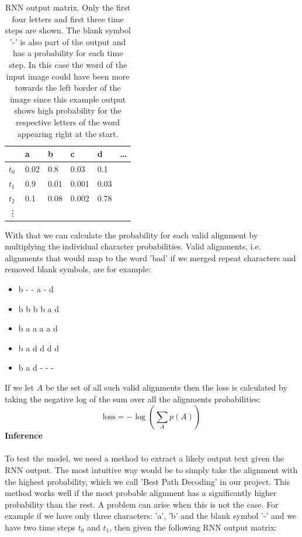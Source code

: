 \documentclass{article}
\begin{document}
\begin{table}[H]
\centering
\begin{tabular}{l|l|l|l|l|l}
       & a & b & c & d &\ldots \\ \hline
\(t_0\) & 0.02 & 0.8 & 0.03 & 0.1 & \\ \hline
\(t_1\) & 0.9 & 0.01 & 0.001 & 0.03 & \\ \hline
\(t_2\) & 0.1 & 0.08 & 0.002 & 0.78 & \\ \hline
\vdots       &         &         &         & 
\end{tabular}
\caption{RNN output matrix. Only the first four letters and first three time steps are shown. The blank  symbol '-' is also part of the output and has a probability for each time step. In this case the word of the input image could have been more towards the left border of the image since this example output shows high probability for the respective letters of the word appearing right at the start.}
\end{table}
With that we can calculate the probability for each valid alignment by multiplying the individual character probabilities. Valid alignments, i.e. alignments that would map to the word 'bad' if we merged repeat characters and removed blank symbols, are for example:
\begin{itemize}
\item b - - a - d
\item b b b b a d 
\item b a a a a d 
\item b a d d d d 
\item b a d - - -
\end{itemize}
If we let \(A\) be the set of all such valid alignments then the loss is calculated by taking the negative log of the sum over all the alignments probabilities:\\
\[
\text{loss} = -\log\left(\sum_A p(A)\right)
\]
\textbf{Inference}\\\\
To test the model, we need a method to extract a likely output text given the RNN output. The most intuitive way would be to simply take the alignment with the highest probability, which we call 'Best Path Decoding' in our project. This method works well if the most probable alignment has a significantly higher probability than the rest. A problem can arise when this is not the case. For example if we have only three characters: 'a', 'b' and the blank symbol '-' and we have two time steps \(t_0\) and \(t_1\), then given the following RNN output matrix:
\end{document}

